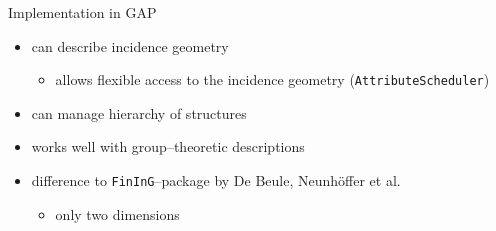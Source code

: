 \documentclass[11pt]{beamer}
\begin{document}
\begin{frame}{Implementation in GAP}
        \begin{itemize}
            \item<2-> can describe incidence geometry
                \begin{itemize}
                    \item<3-> allows flexible access to the incidence geometry (\texttt{AttributeScheduler})
                \end{itemize}
            \item<4-> can manage hierarchy of structures
            \item<5-> {works well with group--theoretic descriptions}
            \item<6-> difference to \texttt{FinInG}--package by De Beule, Neunhöffer et al.
                \begin{itemize}
                    \item<7-> only two dimensions 
                \end{itemize}
        \end{itemize}
\end{frame}


\begin{frame}
    \tableofcontents[pausesections]
\end{frame}



            
\end{document}
